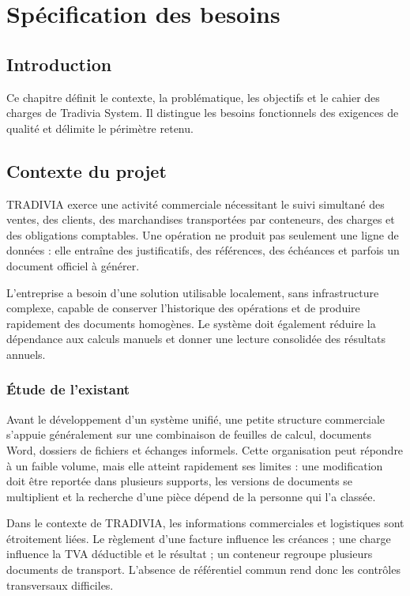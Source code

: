 \documentclass[12pt,a4paper,oneside]{report}
\begin{document}
\tableofcontents
\listoffigures
\listoftables
\clearpage
{}

\chapter{Spécification des besoins}
\section*{Introduction}
Ce chapitre définit le contexte, la problématique, les objectifs et le cahier des charges de Tradivia System. Il distingue les besoins fonctionnels des exigences de qualité et délimite le périmètre retenu.

\section{Contexte du projet}
TRADIVIA exerce une activité commerciale nécessitant le suivi simultané des ventes, des clients, des marchandises transportées par conteneurs, des charges et des obligations comptables. Une opération ne produit pas seulement une ligne de données : elle entraîne des justificatifs, des références, des échéances et parfois un document officiel à générer.

L'entreprise a besoin d'une solution utilisable localement, sans infrastructure complexe, capable de conserver l'historique des opérations et de produire rapidement des documents homogènes. Le système doit également réduire la dépendance aux calculs manuels et donner une lecture consolidée des résultats annuels.

\subsection{Étude de l'existant}
Avant le développement d'un système unifié, une petite structure commerciale s'appuie généralement sur une combinaison de feuilles de calcul, documents Word, dossiers de fichiers et échanges informels. Cette organisation peut répondre à un faible volume, mais elle atteint rapidement ses limites : une modification doit être reportée dans plusieurs supports, les versions de documents se multiplient et la recherche d'une pièce dépend de la personne qui l'a classée.

Dans le contexte de TRADIVIA, les informations commerciales et logistiques sont étroitement liées. Le règlement d'une facture influence les créances ; une charge influence la TVA déductible et le résultat ; un conteneur regroupe plusieurs documents de transport. L'absence de référentiel commun rend donc les contrôles transversaux difficiles.
\end{document}
